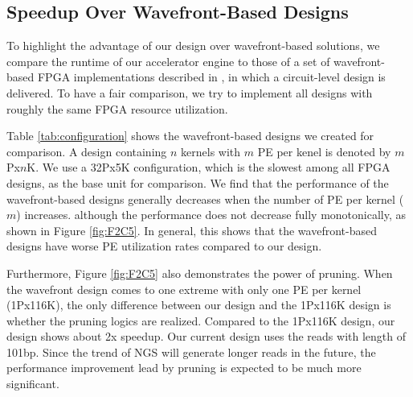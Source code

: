 \subsection{Speedup Over Wavefront-Based Designs}

To highlight the advantage of our design over wavefront-based solutions, 
we compare the runtime of our accelerator engine to those of a set of wavefront-based FPGA implementations described in \cite{Zhang2007}, in which a circuit-level design is delivered. To have a fair comparison, we try to implement all designs with roughly the same FPGA resource utilization.

Table \ref{tab:configuration} shows the wavefront-based designs we created for comparison. 
A design containing $n$ kernels with $m$ PE per kenel is denoted by $m$Px$n$K. 
We use a 32Px5K configuration, which is the slowest among all FPGA designs, as the base unit for comparison.
We find that the performance of the wavefront-based designs generally decreases when the number of PE per kernel ($m$) increases.
although the performance does not decrease fully monotonically, as shown in Figure \ref{fig:F2C5}.
In general, this shows that the wavefront-based designs have worse PE utilization rates compared to our design. 

Furthermore, Figure \ref{fig:F2C5} also demonstrates the power of pruning. 
When the wavefront design comes to one extreme with only one PE per kernel (1Px116K), 
the only difference between our design and the 1Px116K design is whether the pruning logics are realized. 
Compared to the 1Px116K design, our design shows about 2x speedup.
Our current design uses the reads with length of 101bp.
Since the trend of NGS will generate longer reads in the future, the performance improvement lead by pruning is expected to be much more significant.




